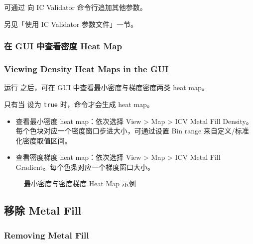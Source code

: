 可通过  向 IC Validator 命令行追加其他参数。

\begin{seeAlsoBox}
另见「使用 IC Validator 参数文件」一节。
\end{seeAlsoBox}

\subsubsection{在 GUI 中查看密度 Heat Map}
\subsubsection*{Viewing Density Heat Maps in the GUI}

运行  之后，可在 GUI 中查看最小密度与梯度密度两类 heat map。

\begin{noteBox}
只有当  设为 \texttt{true} 时，命令才会生成 heat map。
\end{noteBox}

\begin{itemize}
  \item 查看最小密度 heat map：依次选择 View > Map > ICV Metal Fill Density。每个色块对应一个密度窗口步进大小，可通过设置 Bin range 来自定义/标准化密度取值区间。
  \item 查看密度梯度 heat map：依次选择 View > Map > ICV Metal Fill Gradient。每个色条对应一个梯度窗口大小。
\end{itemize}

\begin{figure}[htbp]
\centering
{}
\caption{最小密度与密度梯度 Heat Map 示例}
\label{fig:density-heatmap}
\end{figure}

\subsection{移除 Metal Fill}
\subsubsection*{Removing Metal Fill}

